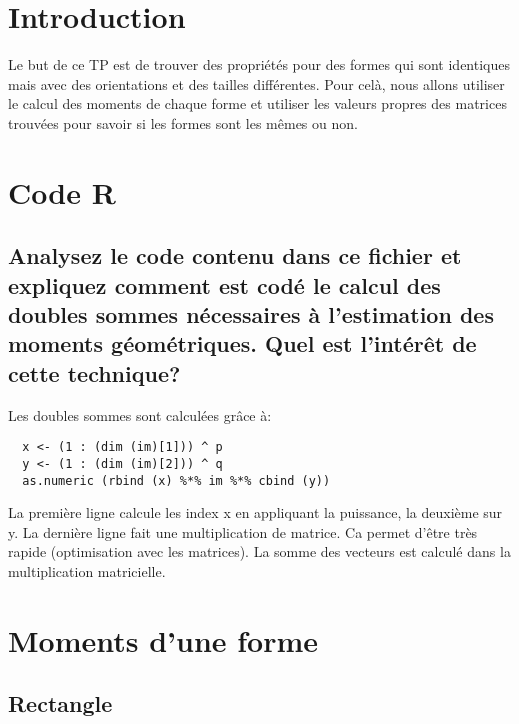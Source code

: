 \documentclass[a4paper,12pt]{report}
\begin{document}


\setcounter{page}{1} 
\newpage


\section*{Introduction}
Le but de ce TP est de trouver des propriétés pour des formes qui sont identiques mais avec des orientations et des tailles différentes. Pour celà, nous allons utiliser le calcul des moments de chaque forme et utiliser les valeurs propres des matrices trouvées pour savoir si les formes sont les mêmes ou non.



\section*{Code R}

\subsection*{Analysez le code contenu dans ce fichier et expliquez comment est codé le calcul des doubles sommes nécessaires à l'estimation des moments géométriques. Quel est l'intérêt de cette technique?}

Les doubles sommes sont calculées grâce à:

\begin{lstlisting}
  x <- (1 : (dim (im)[1])) ^ p
  y <- (1 : (dim (im)[2])) ^ q
  as.numeric (rbind (x) %*% im %*% cbind (y))
\end{lstlisting}
La première ligne calcule les index x en appliquant la puissance,  la deuxième sur y. La dernière ligne fait une multiplication de matrice. Ca permet d'être très rapide (optimisation avec les matrices). La somme des vecteurs est calculé dans la multiplication matricielle.  

\section*{Moments d'une forme}

\subsection*{Rectangle}
\end{document}
